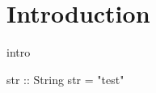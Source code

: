 \section{Introduction}
\label{sec:intro}

intro


\begin{code}
str :: String
str = "test"
\end{code}
